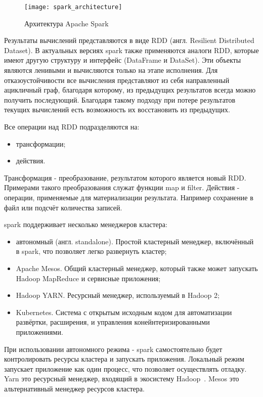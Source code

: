 \begin{figure}
    \centering
    \texttt{[image: spark\_architecture]}
    \caption{Архитектура Apache Spark~\cite{spark_architecture_overview}}
    \label{pic:lit_review:spark_architecture}
\end{figure}

Результаты вычислений представляются в виде RDD (англ. Resilient Distributed Dataset). 
В актуальных версиях spark также применяются аналоги RDD, которые имеют другую структуру и интерфейс (DataFrame и DataSet).
Эти объекты являются ленивыми и вычисляются только на этапе исполнения.
Для отказоустойчивости все вычисления представляют из себя направленный ацикличный граф, благодаря которому, из предыдущих результатов всегда можно получить последующий.
Благодаря такому подходу при потере результатов текущих вычислений есть возможность их восстановить из предыдущих.

Все операции над RDD подразделяются на:
\begin{itemize}
    \item трансформации;
    \item действия.
\end{itemize}

Трансформация - преобразование, результатом которого является новый RDD. 
Примерами такого преобразования служат функции map и filter.
Действия - операции, применяемые для материализации результата.
Например сохранение в файл или подсчёт количества записей.

spark поддерживает несколько менеджеров кластера:
\begin{itemize}
    \item автономный (англ. standalone). Простой кластерный менеджер, включённый в spark, что позволяет легко развернуть кластер;
    \item Apache Mesos. Общий кластерный менеджер, который также может запускать Hadoop MapReduce и сервисные приложения;
    \item Hadoop YARN. Ресурсный менеджер, используемый в Hadoop 2;
    \item Kubernetes. Система с открытым исходным кодом для автоматизации развёртки, расширения, и управления конейнтеризированными приложениями.
\end{itemize}

При использовании автономного режима - spark самостоятельно будет контролировать ресурсы кластера и запускать приложения.
Локальный режим запускает приложение как один процесс, что позволяет осуществлять отладку.
Yarn это ресурсный менеджер, входящий в экосистему Hadoop~\cite{hadoop_difinitive_guide}.
Mesos это альтернативный менеджер ресурсов кластера.
    
